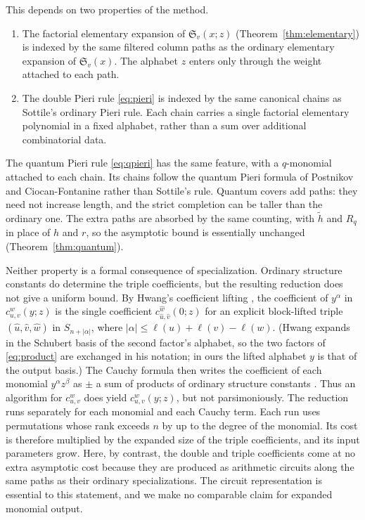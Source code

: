 \documentclass{amsart}
\theoremstyle{definition}
\theoremstyle{remark}
\numberwithin{equation}{section}
\newcommand{\Sch}{\mathfrak S}
\begin{document}
This depends on two properties of the method.
\begin{enumerate}
\item The factorial elementary expansion of $\Sch_v(x;z)$
(Theorem~\ref{thm:elementary}) is indexed by the same filtered column
paths as the ordinary elementary expansion of $\Sch_v(x)$.
The alphabet $z$ enters only through the weight attached to each path.
\item The double Pieri rule \eqref{eq:pieri} is indexed by the same
canonical chains as Sottile's ordinary Pieri rule.
Each chain carries a single factorial elementary polynomial in a fixed
alphabet, rather than a sum over additional combinatorial data.
\end{enumerate}
The quantum Pieri rule \eqref{eq:qpieri} has the same feature, with
a $q$-monomial attached to each chain.
Its chains follow the quantum Pieri formula of Postnikov
\cite{postnikov1999quantum} and Ciocan-Fontanine
\cite{ciocan1999partial} rather than Sottile's rule.
Quantum covers add paths: they need not increase length, and the
strict completion can be taller than the ordinary one.
The extra paths are absorbed by the same counting, with $\tilde h$ and
$R_q$ in place of $h$ and $r$, so the asymptotic bound is essentially
unchanged (Theorem~\ref{thm:quantum}).

Neither property is a formal consequence of specialization.
Ordinary structure constants do determine the triple coefficients, but
the resulting reduction does not give a uniform bound.
By Hwang's coefficient lifting \cite[Theorem~1.2]{hwang2026lifting},
the coefficient of $y^\alpha$ in $c_{u,v}^w(y;z)$ is the single
coefficient $c_{\hat u,\hat v}^{\hat w}(0;z)$ for an explicit
block-lifted triple $(\hat u,\hat v,\hat w)$ in $S_{n+|\alpha|}$, where
$|\alpha|\leq\ell(u)+\ell(v)-\ell(w)$.
(Hwang expands in the Schubert basis of the second factor's alphabet,
so the two factors of \eqref{eq:product} are exchanged in his
notation; in ours the lifted alphabet $y$ is that of the output basis.)
The Cauchy formula then writes the coefficient of each monomial
$y^\alpha z^\beta$ as $\pm$ a sum of products of ordinary structure
constants \cite[Section~5.2]{hwang2026lifting}.
Thus an algorithm for $c_{u,v}^w$ does yield $c_{u,v}^w(y;z)$, but not
parsimoniously.
The reduction runs separately for each monomial and each Cauchy term.
Each run uses permutations whose rank exceeds $n$ by up to the degree of
the monomial.
Its cost is therefore multiplied by the expanded size of the triple
coefficients, and its input parameters grow.
Here, by contrast, the double and triple coefficients come at no extra
asymptotic cost because they are produced as arithmetic circuits along
the same paths as their ordinary specializations.
The circuit representation is essential to this statement, and we make
no comparable claim for expanded monomial output.
\end{document}

